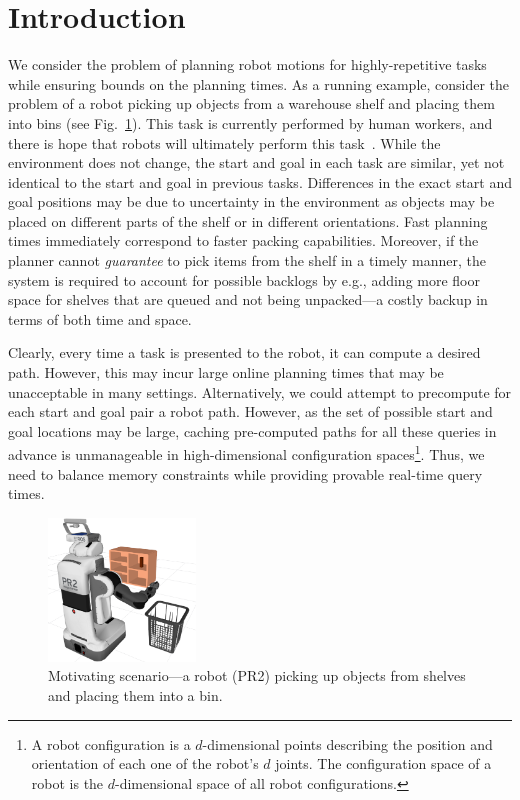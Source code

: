 \documentclass[letterpaper]{article} %
\begin{document}
\section{Introduction}
We consider the problem of planning robot motions for highly-repetitive tasks while ensuring bounds on the planning times.
As a running example, consider the problem of a robot picking up objects from a warehouse shelf and placing them into bins (see Fig.~\ref{fig:PR2}). This task is currently performed by human workers, and there is hope that robots will ultimately perform this task~\cite{correll2018analysis}.
While the environment does not change, the start and goal in each task are similar, yet not identical to the start and goal in previous tasks.
Differences in the exact start and goal positions may be due to uncertainty in the environment as objects may be placed on different parts of the shelf or in different orientations.
Fast planning times immediately correspond to faster packing capabilities. 
Moreover, if the planner cannot \emph{guarantee} to pick items from the shelf in a timely manner, the system is required to account for possible backlogs by e.g., adding more floor space for shelves that are queued and not being unpacked---a costly backup in terms of both time and space.

Clearly, every time a task is presented to the robot, it can compute a desired path.
However, this may incur large online planning times that may be unacceptable in many settings.
%
Alternatively, we could attempt to precompute for each start and goal pair a robot path.
However, as the set of possible start and goal locations may be large, caching pre-computed paths for all these queries in advance is unmanageable in high-dimensional configuration spaces\footnote{
A robot configuration is a $d$-dimensional points describing the position and orientation of each one of the robot's $d$ joints.
The configuration space of a robot is the $d$-dimensional space of all robot configurations.}.
Thus, we need to balance memory constraints while providing provable real-time query times.

\begin{figure}[tb]
  \centering
    \includegraphics[width=0.35\textwidth]{PR2.png}
  \caption{
  Motivating scenario---a robot (PR2) picking up objects from shelves and placing them into a bin.
}
    \label{fig:PR2}
\end{figure}
\end{document}
